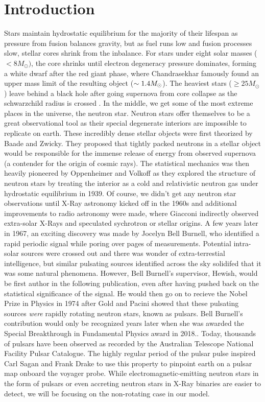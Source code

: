 \section{Introduction}
Stars maintain hydrostatic equilibrium for the majority of their lifespan as pressure from fusion balances gravity, but as fuel runs low and fusion processes slow, stellar cores shrink from the inbalance. For stars under eight solar masses ($<8M_\odot)$, the core shrinks until electron degeneracy pressure dominates, forming a white dwarf after the red giant phase, where Chandrasekhar famously found an upper mass limit of the resulting object ($\sim1.4M_\odot$)\cite{Chandrasekhar1935}. The heaviest stars ($\geq 25M_\odot$) leave behind a black hole after going supernova from core collapse as the schwarzchild radius is crossed \cite{Heger2003}. In the middle, we get some of the most extreme places in the universe, the neutron star. Neutron stars offer themselves to be a great observational tool as their special degenerate interiors are impossible to replicate on earth. These incredibly dense stellar objects were first theorized by Baade and Zwicky. They proposed that tightly packed neutrons in a stellar object would be responsible for the immense release of energy from observed supernova (a contender for the origin of cosmic rays). \cite{Baade} The statistical mechanics was then heavily pioneered by Oppenheimer and Volkoff as they explored the structure of neutron stars by treating the interior as a cold and relativistic neutron gas under hydrostatic equilibrium in 1939. \cite{Oppy} Of course, we didn't get any neutron star observations until X-Ray astronomy kicked off in the 1960s and additional improvements to radio astronomy were made, where Giacconi indirectly observed extra-solar X-Rays and speculated sychrotron or stellar origins. \cite{Giacconi} A few years later in 1967, an exciting discovery was made by Jocelyn Bell Burnell, who identified a rapid periodic signal while poring over pages of measurements. Potential intra-solar sources were crossed out and there was wonder of extra-terrestial intelligence, but similar pulsating sources identified across the sky solidifed that it was some natural phenomena. However, Bell Burnell's supervisor, Hewish, would be first author in the following publication, even after having pushed back on the statistical significance of the signal. He would then go on to recieve the Nobel Prize in Physics in 1974 after Gold and Pacini showed that these pulsating sources \textit{were} rapidly rotating neutron stars, known as pulsars.\cite{apsnews_pulsars_2006,Hewish1968} Bell Burnell's contribution would only be recognized years later when she was awarded the Special Breakthrough in Fundamental Physics award in 2018.\cite{fienberg_bellburnell_2018}. Today, thousands of pulsars have been observed as recorded by the Australian Telescope National Facility Pulsar Catalogue.\cite{manchester_atnf_2005} The highly regular period of the pulsar pulse inspired Carl Sagan and Frank Drake to use this property to pinpoint earth on a pulsar map onboard the voyager probe. \cite{nasa_pia14113_voyager} While electromagnetic-emitting neutron stars in the form of pulsars or even accreting neutron stars in X-Ray binaries are easier to detect, we will be focusing on the non-rotating case in our model.

